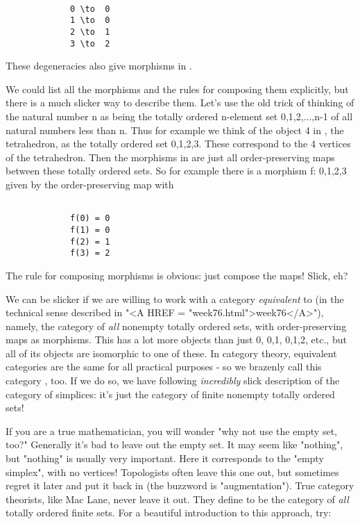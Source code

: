 \begin{verbatim}

             0 \to  0
             1 \to  0
             2 \to  1
             3 \to  2

\end{verbatim}
    
These degeneracies also give morphisms in \Delta .  

We could list all the morphisms and the rules for composing them
explicitly, but there is a much slicker way to describe them.  Let's use
the old trick of thinking of the natural number n as being the totally
ordered n-element set {0,1,2,...,n-1} of all natural numbers less than
n.  Thus for example we think of the object 4 in \Delta , the tetrahedron,
as the totally ordered set {0,1,2,3}.  These correspond to the 4
vertices of the tetrahedron.  Then the morphisms in \Delta  are just all
order-preserving maps between these totally ordered sets.  So for
example there is a morphism f: {0,1,2,3}  given by the
order-preserving map with


\begin{verbatim}

             f(0) = 0
             f(1) = 0
             f(2) = 1
             f(3) = 2

\end{verbatim}
    
The rule for composing morphisms is obvious: just compose the maps!
Slick, eh?  

We can be slicker if we are willing to work with a category \emph{equivalent}
to \Delta  (in the technical sense described in "<A HREF = "week76.html">week76</A>"), namely, the
category of \emph{all} nonempty totally ordered sets, with order-preserving
maps as morphisms.  This has a lot more objects than just {0}, {0,1},
{0,1,2}, etc., but all of its objects are isomorphic to one of these.
In category theory, equivalent categories are the same for all practical
purposes - so we brazenly call this category \Delta , too.  If we do
so, we have following \emph{incredibly} slick description of the category
of simplices: it's just the category of finite nonempty totally ordered
sets!

If you are a true mathematician, you will wonder "why not use the empty
set, too?"  Generally it's bad to leave out the empty set.  It may seem
like "nothing", but "nothing" is usually very important.  Here it
corresponds to the "empty simplex", with no vertices!  Topologists often
leave this one out, but sometimes regret it later and put it back in
(the buzzword is "augmentation").  True category theorists, like Mac
Lane, never leave it out.  They define \Delta  to be the category of \emph{all}
totally ordered finite sets.  For a beautiful introduction to this
approach, try:

